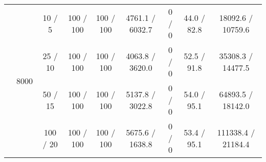 \documentclass[twoside,11pt]{article}
\begin{document}
\begin{table}[H]
\begin{tabular}{  c | c | c || c | c | c || c | c | c }
\hhline {~|-|-||-|-|-||-|-|-}
& \multirow{4}{*}{8000}
& 10 / 5 & 100 / 100 & 100 / 100 & 4761.1 / 6032.7 & \cellcolor{yellow!100} 0 / 0 & \cellcolor{yellow!100} 44.0 / 82.8 & 18092.6 / 10759.6 \\
& & 25 / 10 & 100 / 100  & 100 / 100 & 4063.8 / 3620.0 & \cellcolor{yellow!100} 0 / 0 & \cellcolor{yellow!100} 52.5 / 91.8 & 35308.3 / 14477.5 \\
& & 50 / 15 & 100 / 100 & 100 / 100  & 5137.8 / 3022.8 & \cellcolor{yellow!100} 0 / 0 & \cellcolor{yellow!100} 54.0 / 95.1 & 64893.5 / 18142.0  \\
& & 100 / 20 & 100 / 100 & 100 / 100 & 5675.6 / 1638.8 & \cellcolor{yellow!100} 0 / 0 & \cellcolor{yellow!100} 53.4 / 95.1 & 111338.4 / 21184.4 \\

\end{tabular}
\end{table}
\end{document}
